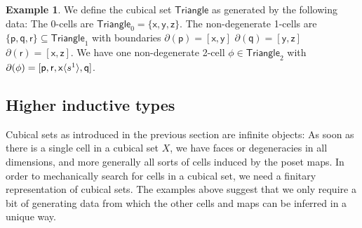 \documentclass[11pt]{article}
\theoremstyle{definition}
\newtheorem{example}{Example}
\newcommand{\mlist}[1]{[ {#1} ]}
\newcommand{\smap}[1]{s^{{#1}}}
\newcommand{\dmap}[2]{d^{({#1} , {#2})}}
\newcommand{\cont}[2]{\ensuremath{ \ifthenelse{\equal{#2}{}}{#1}{{#1}\langle{#2}\rangle}} }
\newcommand{\cset}[1]{\ensuremath{\mathsf{{#1}}}}
\newcommand{\boundary}[1]{\partial({#1})}
\begin{document}
\begin{example}\label{exp:triangle}
  We define the cubical set $\cset{Triangle}$ as generated by the following
  data: The 0-cells are $\cset{Triangle}_0 = \{ \cset{x} , \cset{y} , \cset{z}
  \}$. The non-degenerate 1-cells are $\{ \cset{p} ,
  \cset{q} , \cset{r} \} \subseteq \cset{Triangle}_1$ with boundaries
  $\boundary{\cset{p}} = \mlist{ \cset{x} , \cset{y}}$
  $\boundary{\cset{q}} = \mlist{ \cset{y} , \cset{z}}$
  $\boundary{\cset{r}} = \mlist{ \cset{x} , \cset{z}}$.
  We have one non-degenerate 2-cell $\cset{\phi} \in \cset{Triangle}_2$ with
  $\boundary{\cset{\phi}} = \mlist{\cset{p} , \cset{r} , \cont{\cset{x}}{\smap{1}}  ,\cset{q}}$.
  

\end{example}



\subsection{Higher inductive types}
\label{ssec:hits}

Cubical sets as introduced in the previous section are infinite objects:
As soon as there is a single cell in a cubical set $X$, we have faces or
degeneracies in all dimensions, and more generally all sorts of cells induced by
the poset maps. In order to mechanically search for cells in a cubical set, we
need a finitary representation of cubical sets. The examples above suggest that
we only require a bit of generating data from which the other cells and maps can
be inferred in a unique way.

\end{document}
